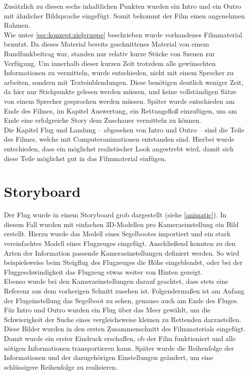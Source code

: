 Zusätzlich zu diesen sechs inhaltlichen Punkten wurden ein Intro und ein Outro mit ähnlicher Bildsprache eingefügt. Somit bekommt der Film einen angenehmen Rahmen.\\
Wie unter \autoref{sec:konzept:zielgruppe} beschrieben wurde vorhandenes Filmmaterial benutzt. Da dieses Material bereits geschnittenes Material von einem Rundfunkbeitrag war, standen nur relativ kurze Stücke von Szenen zur Verfügung. Um innerhalb dieser kurzen Zeit trotzdem alle gewünschten Informationen zu vermitteln, wurde entschieden, nicht mit einem Sprecher zu arbeiten, sondern mit Texteinblendungen. Diese benötigen deutlich weniger Zeit, da hier nur Stichpunkte gelesen werden müssen, und keine vollständigen Sätze von einem Sprecher gesprochen werden müssen.
Später wurde entschieden am Ende des Filmes, im Kapitel Auswertung, ein Rettungsfloß einzufügen, um am Ende eine erfolgreiche Story dem Zuschauer vermitteln zu können.\\
Die Kapitel Flug und Landung -- abgesehen von Intro und Outro -- sind die Teile des Filmes, welche mit Computeranimationen entstanden sind. Hierbei wurde entschieden, dass ein möglichst realistischer Look angestrebt wird, damit sich diese Teile möglichst gut in das Filmmaterial einfügen.

\section{Storyboard} %
\label{sec:konzept:animatic}

Der Flug wurde in einem Storyboard grob dargestellt (siehe \autoref{animatic}). In diesem Fall wurden mit einfachen 3D-Modellen pro Kameraeinstellung ein Bild erstellt. Hierzu wurde das Modell eines Segelbootes importiert und ein stark vereinfachtes Modell eines Flugzeuges eingefügt. Anschließend konnten zu den Arten der Information passende Kameraeinstellungen definiert werden. So wird beispielsweise beim Steigflug des Flugzeuges die Höhe eingeblendet, oder bei der Fluggeschwindigkeit das Flugzeug etwas weiter von Hinten gezeigt. \\
Ebenso wurde bei den Kameraeinstellungen darauf geachtet, dass stets eine Referenz aus dem vorherigen Schnitt zusehen ist. Folgendermaßen ist am Anfang der Flugeinstellung das Segelboot zu sehen, genauso auch am Ende des Fluges.\\
Für Intro und Outro wurden ein Flug über das Meer gewählt, um die Schwierigkeit der Suche eines vergleichsweise kleinen zu Rettenden darzustellen.
Diese Bilder wurden in den ersten Zusammenschnitt des Filmmaterials eingefügt. Damit wurde ein erster Eindruck erschaffen, ob der Film funktioniert und alle nötigen Informationen transportieren kann. Später wurde die Reihenfolge der Informationen und der dazugehörigen Einstellungen geändert, um eine schlüssigere Reihenfolge zu realisieren.

